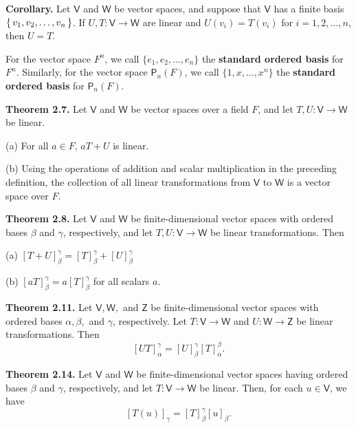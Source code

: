 \documentclass{article}
\newcommand{\0}{\mathit{0}}
\begin{document}
\medskip

\textbf{Corollary.} Let $\mathsf{V}$ and $\mathsf{W}$ be vector spaces, and suppose that
$\mathsf{V}$ has a finite basis $\set{v_1, v_2, \dots, v_n}$.
If $U, T: \mathsf{V} \to \mathsf{W}$ are linear and $U(v_i) = T(v_i)$ for
$i = 1, 2, \dots, n$, then $U = T$.

\medskip

For the vector space $F^n$, we call $\{e_1, e_2, \dots, e_n\}$ the 
\textbf{standard ordered basis} for $F^n$. Similarly, for the vector space $\mathsf{P}_n(F)$, 
we call $\{1, x, \dots, x^n\}$ the \textbf{standard ordered basis} for $\mathsf{P}_n(F)$.

\medskip

\textbf{Theorem 2.7.} Let $\mathsf{V}$ and $\mathsf{W}$ be vector spaces over a field $F$,
and let $T, U: \mathsf{V} \to \mathsf{W}$ be linear.

(a) For all $a \in F$, $aT + U$ is linear.

(b) Using the operations of addition and scalar multiplication in the preceding
definition, the collection of all linear transformations from $\mathsf{V}$ to
$\mathsf{W}$ is a vector space over $F$.

\medskip

\textbf{Theorem 2.8.} Let $\mathsf{V}$ and $\mathsf{W}$ be finite-dimensional vector spaces
with ordered bases $\beta$ and $\gamma$, respectively, and let $T, U: \mathsf{V} \to \mathsf{W}$
be linear transformations. Then

(a) $\left[ T + U \right]^\gamma_\beta = \left[ T \right]^\gamma_\beta + \left[ U \right]^\gamma_\beta$

(b) $\left[ aT \right]^\gamma_\beta = a \left[ T \right]^\gamma_\beta$ for all scalars $a$.

\medskip

\textbf{Theorem 2.11.} Let $\mathsf{V}, \mathsf{W},$ and $\mathsf{Z}$ be finite-dimensional vector spaces
with ordered bases $\alpha, \beta,$ and $\gamma$, respectively. Let
$T: \mathsf{V} \to \mathsf{W}$ and $U: \mathsf{W} \to \mathsf{Z}$ be linear transformations.
Then
\[
    \left[ UT \right]^\gamma_\alpha = \left[ U \right]^\gamma_\beta \left[ T \right]^\beta_\alpha.
\]

\medskip

\textbf{Theorem 2.14.} Let $\mathsf{V}$ and $\mathsf{W}$ be finite-dimensional vector spaces
having ordered bases $\beta$ and $\gamma$, respectively, and let
$T: \mathsf{V} \to \mathsf{W}$ be linear.
Then, for each $u \in \mathsf{V}$, we have
\[
    \left[ T(u) \right]_\gamma = \left[ T \right]^\gamma_\beta \left[ u \right]_\beta.
\]
\end{document}
